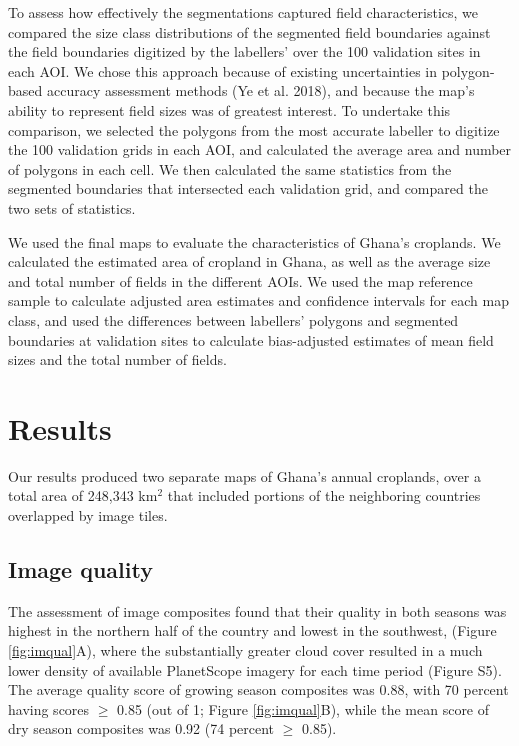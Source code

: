 \documentclass[11pt,a4paper]{article}
\begin{document}
To assess how effectively the segmentations captured field
characteristics, we compared the size class distributions of the
segmented field boundaries against the field boundaries digitized by the
labellers' over the 100 validation sites in each AOI. We chose this
approach because of existing uncertainties in polygon-based accuracy
assessment methods (Ye et al. 2018), and because the map's ability to
represent field sizes was of greatest interest. To undertake this
comparison, we selected the polygons from the most accurate labeller to
digitize the 100 validation grids in each AOI, and calculated the
average area and number of polygons in each cell. We then calculated the
same statistics from the segmented boundaries that intersected each
validation grid, and compared the two sets of statistics.

We used the final maps to evaluate the characteristics of Ghana's
croplands. We calculated the estimated area of cropland in Ghana, as
well as the average size and total number of fields in the different
AOIs. We used the map reference sample to calculate adjusted area
estimates and confidence intervals for each map class, and used the
differences between labellers' polygons and segmented boundaries at
validation sites to calculate bias-adjusted estimates of mean field
sizes and the total number of fields.

\hypertarget{results}{%
\section{Results}\label{results}}

Our results produced two separate maps of Ghana's annual croplands, over
a total area of 248,343 km\(^2\) that included portions of the
neighboring countries overlapped by image tiles.

\hypertarget{image-quality}{%
\subsection{Image quality}\label{image-quality}}

The assessment of image composites found that their quality in both
seasons was highest in the northern half of the country and lowest in
the southwest, (Figure \ref{fig:imqual}A), where the substantially
greater cloud cover resulted in a much lower density of available
PlanetScope imagery for each time period (Figure S5). The average
quality score of growing season composites was 0.88, with 70 percent
having scores \(\geq\) 0.85 (out of 1; Figure \ref{fig:imqual}B), while
the mean score of dry season composites was 0.92 (74 percent \(\geq\)
0.85).
\end{document}
